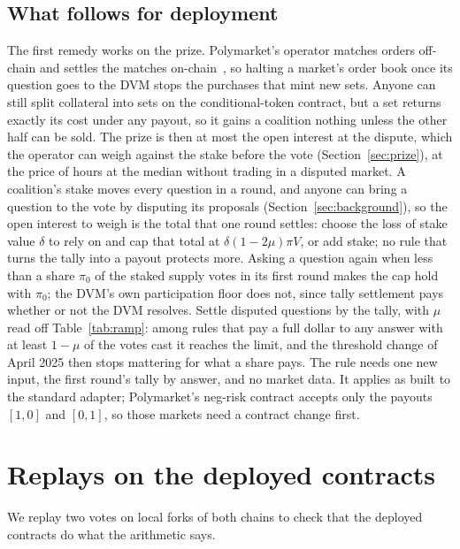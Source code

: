 \documentclass[conference,compsoc]{IEEEtran}
\newcommand{\muparam}{\mu}
\begin{document}
\subsection{What follows for deployment}
\label{sec:deploy}
 The first remedy works on the prize. Polymarket's operator matches orders off-chain and settles the matches on-chain~\cite{ctfexchange}, so halting a market's order book once its question goes to the DVM stops the purchases that mint new sets. Anyone can still split collateral into sets on the conditional-token contract, but a set returns exactly its cost under any payout, so it gains a coalition nothing unless the other half can be sold. The prize is then at most the open interest at the dispute, which the operator can weigh against the stake before the vote (Section~\ref{sec:prize}), at the price of \prizeVoteHours{} hours at the median without trading in a disputed market. A coalition's stake moves every question in a round, and anyone can bring a question to the vote by disputing its proposals (Section~\ref{sec:background}), so the open interest to weigh is the total that one round settles: choose the loss of stake value $\delta$ to rely on and cap that total at $\delta(1 - 2\muparam)\pi V$, or add stake; no rule that turns the tally into a payout protects more. Asking a question again when less than a share $\pi_0$ of the staked supply votes in its first round makes the cap hold with $\pi_0$; the DVM's own participation floor does not, since tally settlement pays whether or not the DVM resolves. Settle disputed questions by the tally, with $\muparam$ read off Table~\ref{tab:ramp}: among rules that pay a full dollar to any answer with at least $1 - \muparam$ of the votes cast it reaches the limit, and the threshold change of April 2025 then stops mattering for what a share pays. The rule needs one new input, the first round's tally by answer, and no market data. It applies as built to the standard adapter; Polymarket's neg-risk contract accepts only the payouts $[1,0]$ and $[0,1]$, so those markets need a contract change first.

\section{Replays on the deployed contracts}
\label{sec:fork}
We replay two votes on local forks of both chains to check that the deployed contracts do what the arithmetic says.
\end{document}
